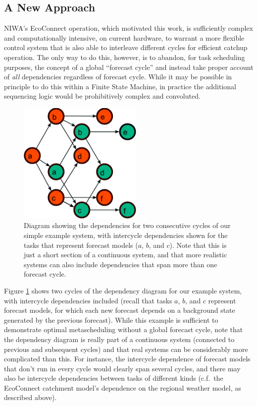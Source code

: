 \documentclass[11pt,a4paper]{article}
\begin{document}
\subsection{A New Approach} 

NIWA's EcoConnect operation, which motivated this work, is sufficiently
complex and computationally intensive, on current hardware, to warrant a
more flexible control system that is also able to interleave different
cycles for efficient catchup operation.  The only way to do this,
however, is to abandon, for task scheduling purposes, the concept of a
global ``forecast cycle'' and instead take proper account of {\em all}
dependencies regardless of forecast cycle.  While it may be possible in
principle to do this within a Finite State Machine, in practice the
additional sequencing logic would be prohibitively complex and convoluted. 

\begin{figure} \begin{center}
    \includegraphics[width=6cm]{dependencies-two} \end{center}
    \caption{\small Diagram showing the dependencies for two consecutive
    cycles of our simple example system, with intercycle dependencies
    shown for the tasks that represent forecast models ($a$, $b$, and
    $c$).  Note that this is just a short section of a continuous
    system, and that more realistic systems can also include dependencies
    that span more than one forecast cycle.} 
    \label{fig-dep-two}
\end{figure}
Figure \ref{fig-dep-two} shows two cycles of the dependency
diagram for our example system, with intercycle dependencies included
(recall that tasks $a$, $b$, and $c$ represent forecast models, for
which each new forecast depends on a background state generated by the
previous forecast). While this example is sufficient to demonstrate
optimal metascheduling without a global forecast cycle, note that
the dependency diagram is really part of a continuous system (connected
to previous and subsequent cycles) and that real systems can be
considerably more complicated than this. For instance, the
intercycle dependence of forecast models that don't run in every
cycle would clearly span several cycles, and there may also be
intercycle dependencies between tasks of different kinds (c.f.\ the
EcoConnect catchment model's dependence on the regional weather model,
as described above). 
\end{document}
